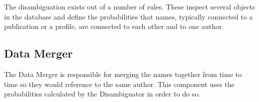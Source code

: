 The disambiguation exists out of a number of rules. These inspect several objects in the database and define the probabilities that names, typically connected to a publication or a profile, are connected to each other and to one author.

\subsection{Data Merger}

The Data Merger is responsible for merging the names together from time to time so they would reference to the same author. This component uses the probabilities calculated by the Disambiguator in order to do so.

